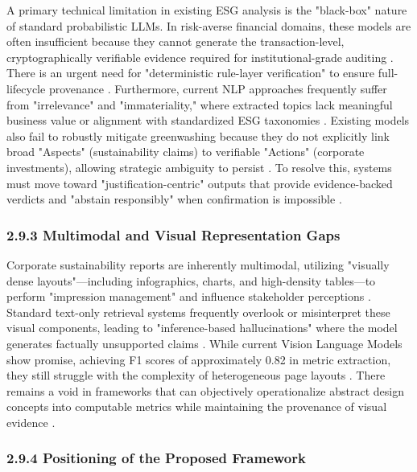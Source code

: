 \documentclass{article}
\begin{document}
A primary technical limitation in existing ESG analysis is the "black-box" nature of standard probabilistic LLMs. In risk-averse financial domains, these models are often insufficient because they cannot generate the transaction-level, cryptographically verifiable evidence required for institutional-grade auditing  \parencite{steven_paul_nohr_a6874924}. There is an urgent need for "deterministic rule-layer verification" to ensure full-lifecycle provenance  \parencite{steven_paul_nohr_a6874924}. Furthermore, current NLP approaches frequently suffer from "irrelevance" and "immateriality," where extracted topics lack meaningful business value or alignment with standardized ESG taxonomies  \parencite{keane_ong_8fec4760}. Existing models also fail to robustly mitigate greenwashing because they do not explicitly link broad "Aspects" (sustainability claims) to verifiable "Actions" (corporate investments), allowing strategic ambiguity to persist  \parencite[]{keane_ong_0a5de439, keane_ong_369a0b63}. To resolve this, systems must move toward "justification-centric" outputs that provide evidence-backed verdicts and "abstain responsibly" when confirmation is impossible  \parencite{kaoukis__georgios_35bab107}.
\subsubsection{2.9.3 Multimodal and Visual Representation Gaps}

Corporate sustainability reports are inherently multimodal, utilizing "visually dense layouts"—including infographics, charts, and high-density tables—to perform "impression management" and influence stakeholder perceptions  \parencite[]{lars_wilhelmi_8d7e860b, bingjie_li_487d69fd}. Standard text-only retrieval systems frequently overlook or misinterpret these visual components, leading to "inference-based hallucinations" where the model generates factually unsupported claims  \parencite[]{g_saipooja_m_n_488bfdd6, lars_wilhelmi_8d7e860b}. While current Vision Language Models show promise, achieving F1 scores of approximately 0.82 in metric extraction, they still struggle with the complexity of heterogeneous page layouts  \parencite[]{tanay_gupta_aafe0c6a, lars_wilhelmi_8d7e860b}. There remains a void in frameworks that can objectively operationalize abstract design concepts into computable metrics while maintaining the provenance of visual evidence  \parencite{bingjie_li_487d69fd}.
\subsubsection{2.9.4 Positioning of the Proposed Framework}
\end{document}
